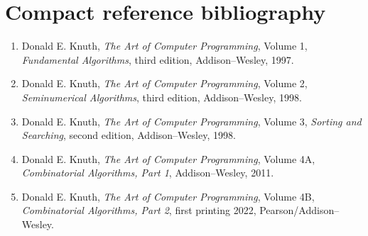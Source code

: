 \documentclass[11pt,letterpaper]{article}
\begin{document}
\section{Compact reference bibliography}
\begin{enumerate}
\item Donald E. Knuth, \emph{The Art of Computer Programming}, Volume 1, \emph{Fundamental Algorithms}, third edition, Addison--Wesley, 1997.
\item Donald E. Knuth, \emph{The Art of Computer Programming}, Volume 2, \emph{Seminumerical Algorithms}, third edition, Addison--Wesley, 1998.
\item Donald E. Knuth, \emph{The Art of Computer Programming}, Volume 3, \emph{Sorting and Searching}, second edition, Addison--Wesley, 1998.
\item Donald E. Knuth, \emph{The Art of Computer Programming}, Volume 4A, \emph{Combinatorial Algorithms, Part 1}, Addison--Wesley, 2011.
\item Donald E. Knuth, \emph{The Art of Computer Programming}, Volume 4B, \emph{Combinatorial Algorithms, Part 2}, first printing 2022, Pearson/Addison--Wesley.
\end{enumerate}
\end{document}

